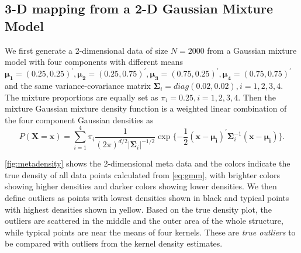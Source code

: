 \documentclass[11pt,a4paper,]{article}
\begin{document}
\hypertarget{twodgaussian}{%
\subsection{3-D mapping from a 2-D Gaussian Mixture Model}\label{twodgaussian}}

We first generate a 2-dimensional data of size \(N=2000\) from a Gaussian mixture model with four components with different means
\(\pmb{\mu_1}=(0.25, 0.25)^\prime, \pmb{\mu_2}=(0.25, 0.75)^\prime, \pmb{\mu_3}=(0.75, 0.25)^\prime, \pmb{\mu_4}=(0.75, 0.75)^\prime\) and the same variance-covariance matrix \(\pmb{\Sigma}_i=diag(0.02, 0.02), i=1,2,3,4\). The mixture proportions
are equally set as \(\pi_i=0.25, i=1,2,3,4\).
Then the mixture Gaussian mixture density function is a weighted linear combination of the four component Gaussian densities as
\begin{equation}
\label{eq:gmm}
P(\pmb{X}=\pmb{x}) = \sum_{i=1}^{4}\pi_i \frac{1}{(2\pi)^{d/2}|\pmb{\Sigma}_i|^{-1/2}} \exp{\{-\frac{1}{2} (\pmb{x}-\pmb{\mu_i})^\prime \pmb{\Sigma}_i^{-1} (\pmb{x}-\pmb{\mu_i}) \}}.
\end{equation}

\autoref{fig:metadensity} shows the 2-dimensional meta data and the colors indicate the true density of all data points calculated from \eqref{eq:gmm}, with brighter colors showing higher densities and darker colors showing lower densities. We then define outliers as points with lowest densities shown in black and typical points with highest densities shown in yellow. Based on the true density plot, the outliers are scattered in the middle and the outer area of the whole structure, while typical points are near the means of four kernels. These are \emph{true outliers} to be compared with outliers from the
kernel density estimates.
\end{document}
